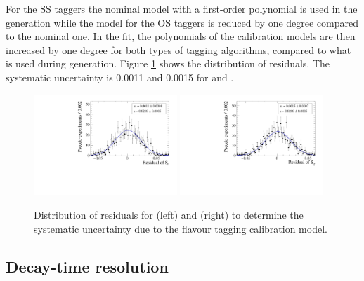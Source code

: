 For the SS taggers the nominal model with a first-order polynomial is used in the generation while the model for the OS taggers is reduced by one degree compared to the nominal one.
In the fit, the polynomials of the calibration models are then increased by one degree for both types of tagging algorithms, compared to what is used during generation. Figure \ref{fig:systUncertFTmodel} shows the distribution of residuals. The systematic uncertainty is \num{0.0011} and \num{0.0015} for \Sf and \Sfbar.
\begin{figure}[tbp]
    \centering
    \includegraphics[width=0.48\textwidth]{10Systematics/figs/FT_Sf_res.pdf}
    \includegraphics[width=0.48\textwidth]{10Systematics/figs/FT_Sfbar_res.pdf}
    \caption{Distribution of residuals for \Sf (left) and \Sfbar (right) to determine the systematic uncertainty due to the flavour tagging calibration model.}
    \label{fig:systUncertFTmodel}
\end{figure}

\subsection*{Decay-time resolution}

